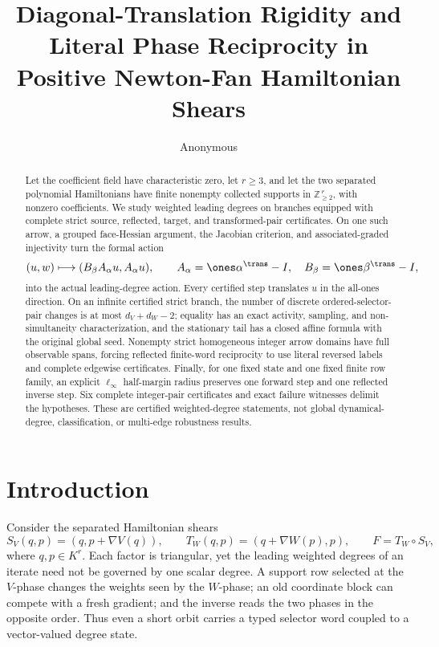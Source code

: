 \documentclass[11pt]{article}
\title{Diagonal-Translation Rigidity and Literal Phase Reciprocity in Positive Newton-Fan Hamiltonian Shears}
\author{Anonymous}
\date{}
\theoremstyle{definition}
\theoremstyle{remark}
\begin{document}
\maketitle

\begin{abstract}
Let the coefficient field have characteristic zero, let \(r\geq3\), and let
the two separated polynomial Hamiltonians have finite nonempty collected
supports in \(\mathbb Z_{\geq2}^{\,r}\), with nonzero coefficients.  We
study weighted leading degrees on branches equipped with complete strict
source, reflected, target, and transformed-pair certificates.  On one such
arrow, a grouped face-Hessian argument, the Jacobian criterion, and
associated-graded injectivity turn the formal action
\[
 (u,w)\longmapsto(B_\beta A_\alpha u,A_\alpha u),
 \qquad A_\alpha=\ones\alpha^{\trans}-I,\quad
 B_\beta=\ones\beta^{\trans}-I,
\]
into the actual leading-degree action.  Every certified step translates
\(u\) in the all-ones direction.  On an infinite certified strict branch,
the number of discrete ordered-selector-pair changes is at most
\(d_V+d_W-2\); equality has an exact activity, sampling, and
non-simultaneity characterization, and the stationary tail has a closed
affine formula with the original global seed.  Nonempty strict homogeneous
integer arrow domains have full observable spans, forcing reflected
finite-word reciprocity to use literal reversed labels and complete
edgewise certificates.  Finally, for one fixed state and one fixed finite
row family, an explicit \(\ell_\infty\) half-margin radius preserves one
forward step and one reflected inverse step.  Six complete integer-pair
certificates and exact failure witnesses delimit the hypotheses.  These
are certified weighted-degree statements, not global dynamical-degree,
classification, or multi-edge robustness results.
\end{abstract}

\section{Introduction}

Consider the separated Hamiltonian shears
\[
 S_V(q,p)=(q,p+\nabla V(q)),\qquad
 T_W(q,p)=(q+\nabla W(p),p),\qquad F=T_W\circ S_V ,
\]
where \(q,p\in K^r\).  Each factor is triangular, yet the leading weighted
degrees of an iterate need not be governed by one scalar degree.  A support
row selected at the \(V\)-phase changes the weights seen by the
\(W\)-phase; an old coordinate block can compete with a fresh gradient;
and the inverse reads the two phases in the opposite order.  Thus even a
short orbit carries a typed selector word coupled to a vector-valued degree
state.
\end{document}
